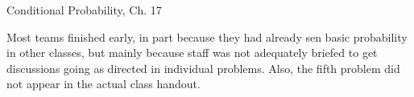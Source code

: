 \documentclass[handout]{mcs}
\begin{document}

\begin{staffnotes}
Conditional Probability, Ch. 17

Most teams finished early, in part because they had already sen basic
probability in other classes, but mainly because staff was not
adequately briefed to get discussions going as directed in individual
problems.  Also, the fifth problem did not appear in the actual class
handout.
\end{staffnotes}












\end{document}
